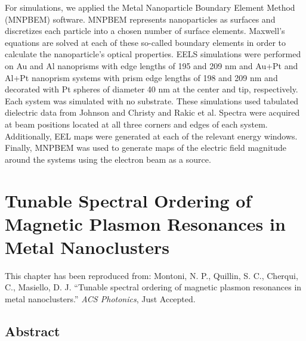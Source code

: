 \documentclass [11pt, proquest] {uwthesis}[2016/11/22]
\begin{document}
For simulations, we applied the Metal Nanoparticle Boundary Element Method (MNPBEM) software. \cite{Hohenester2012,Hohenester2014} MNPBEM represents nanoparticles as surfaces and discretizes each particle into a chosen number of surface elements. Maxwell’s equations are solved at each of these so-called boundary elements in order to calculate the nanoparticle’s optical properties. EELS simulations were performed on Au and Al nanoprisms with edge lengths of 195 and 209 nm and Au+Pt and Al+Pt nanoprism systems with prism edge lengths of 198 and 209 nm and decorated with Pt spheres of diameter 40 nm at the center and tip, respectively. Each system was simulated with no substrate. These simulations used tabulated dielectric data from Johnson and Christy \cite{JC} and Rakic et al. \cite{Rakic} Spectra were acquired at beam positions located at all three corners and edges of each system. Additionally, EEL maps were generated at each of the relevant energy windows. Finally, MNPBEM was used to generate maps of the electric field magnitude around the systems using the electron beam as a source.

\newpage
\chapter{Tunable Spectral Ordering of Magnetic Plasmon Resonances in Metal Nanoclusters}

This chapter has been reproduced from:
 Montoni, N. P., Quillin, S. C., Cherqui, C., Masiello, D. J. ``Tunable spectral ordering of magnetic plasmon resonances in metal nanoclusters.'' {\it ACS Photonics}, Just Accepted.

\section{Abstract}
\end{document}
